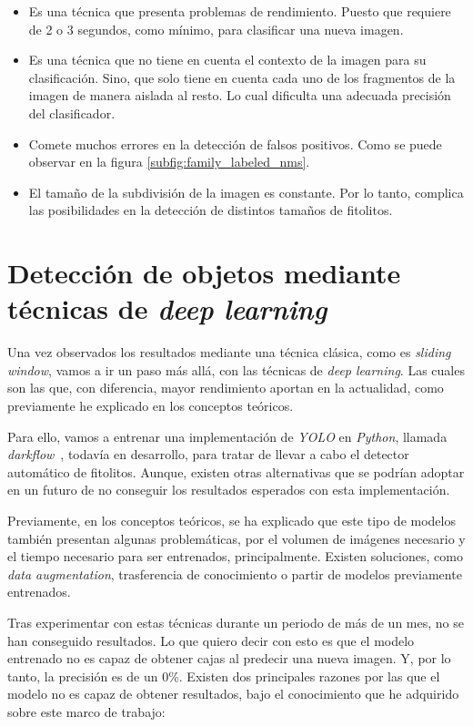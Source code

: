 \begin{itemize}
	\item Es una técnica que presenta problemas de rendimiento. Puesto que requiere de 2 o 3 segundos, como mínimo, para clasificar una nueva imagen.
	\item Es una técnica que no tiene en cuenta el contexto de la imagen para su clasificación. Sino, que solo tiene en cuenta cada uno de los fragmentos de la imagen de manera aislada al resto. Lo cual dificulta una adecuada precisión del clasificador.
	\item Comete muchos errores en la detección de falsos positivos. Como se puede observar en la figura \ref{subfig:family_labeled_nms}.
	\item El tamaño de la subdivisión de la imagen es constante. Por lo tanto, complica las posibilidades en la detección de distintos tamaños de fitolitos.
\end{itemize}

\section{Detección de objetos mediante técnicas de \textit{deep learning}}

Una vez observados los resultados mediante una técnica clásica, como es \textit{sliding window}, vamos a ir un paso más allá, con las técnicas de \textit{deep learning}. Las cuales son las que, con diferencia, mayor rendimiento aportan en la actualidad, como previamente he explicado en los conceptos teóricos.

Para ello, vamos a entrenar una implementación de \textit{YOLO} en \textit{Python}, llamada \textit{darkflow}~\cite{darkflow}, todavía en desarrollo, para tratar de llevar a cabo el detector automático de fitolitos. Aunque, existen otras alternativas que se podrían adoptar en un futuro de no conseguir los resultados esperados con esta implementación.

Previamente, en los conceptos teóricos, se ha explicado que este tipo de modelos también presentan algunas problemáticas, por el volumen de imágenes necesario y el tiempo necesario para ser entrenados, principalmente. Existen soluciones, como \textit{data augmentation}, trasferencia de conocimiento o partir de modelos previamente entrenados.

Tras experimentar con estas técnicas durante un periodo de más de un mes, no se han conseguido resultados. Lo que quiero decir con esto es que el modelo entrenado no es capaz de obtener cajas al predecir una nueva imagen. Y, por lo tanto, la precisión es de un 0\%. Existen dos principales razones por las que el modelo no es capaz de obtener resultados, bajo el conocimiento que he adquirido sobre este marco de trabajo:

